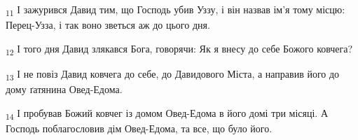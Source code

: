 \begin{tcolorbox}
\textsubscript{11} І зажурився Давид тим, що Господь убив Уззу, і він назвав ім'я тому місцю: Перец-Узза, і так воно зветься аж до цього дня.
\end{tcolorbox}
\begin{tcolorbox}
\textsubscript{12} І того дня Давид злякався Бога, говорячи: Як я внесу до себе Божого ковчега?
\end{tcolorbox}
\begin{tcolorbox}
\textsubscript{13} І не повіз Давид ковчега до себе, до Давидового Міста, а направив його до дому ґатянина Овед-Едома.
\end{tcolorbox}
\begin{tcolorbox}
\textsubscript{14} І пробував Божий ковчег із домом Овед-Едома в його домі три місяці. А Господь поблагословив дім Овед-Едома, та все, що було його.
\end{tcolorbox}
